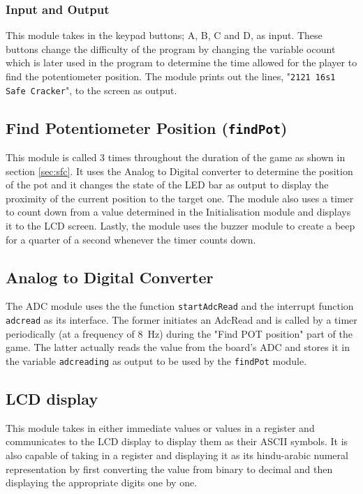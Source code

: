 \documentclass[a4paper]{article}
\begin{document}
\subsubsection{Input and Output}
This module takes in the keypad buttons; A, B, C and D, as input. These buttons change the difficulty of the
program by changing the variable ocount which is later used in the program to determine the time allowed for 
the player to find the potentiometer position. The module prints out the lines, "\texttt{2121 16s1 Safe Cracker}", to the screen as output.

\subsection{Find Potentiometer Position (\texttt{findPot})}
This module is called 3 times throughout the duration of the game as shown in section \ref{sec:sfc}. It uses the
Analog to Digital converter to determine the position of the pot and it changes the state of the LED bar as
output to display the proximity of the current position to the target one. The module also uses a timer to count
down from a value determined in the Initialisation module and displays it to the LCD screen. Lastly, the module
uses the buzzer module to create a beep for a quarter of a second whenever the timer counts down.

\subsection{Analog to Digital Converter}
The ADC module uses the the function \verb|startAdcRead| and the interrupt function \verb|adcread| as its 
interface. The former initiates an AdcRead and is called by a timer periodically (at a frequency of 
\SI{8}{\hertz}) during the "Find POT position" part of the game. The latter actually reads the value from the 
board's ADC and stores it in the variable \verb|adcreading| as output to be used by the \verb|findPot| module.

\subsection{LCD display}
This module takes in either immediate values or values in a register and communicates to the LCD display to
display them as their ASCII symbols. It is also capable of taking in a register and displaying it as its
hindu-arabic numeral representation by first converting the value from binary to decimal and then displaying
the appropriate digits one by one.
\end{document}
